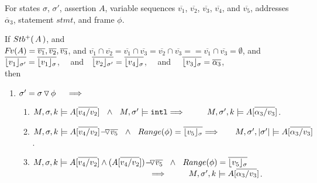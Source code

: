 \begin{lemma}
\label{l:calls}
For states $\sigma$, $\sigma'$, assertion $A$, %
variable sequences  $\overline{v_1}$,    $\overline{v_2}$,  $\overline{v_3}$,   $\overline{v_4}$, and  $\overline{v_5}$,
addresses $\overline \alpha_3$, statement $stmt$, and frame $\phi$.

$ ~ $ %
\\
If $ \Pos A$, and \\
 $\fv(A) =\overline{v_1},\overline{v_2}, \overline{v_3}$,  and  $\overline{v_1} \cap \overline{v_2} = \overline{v_1} \cap \overline{v_3} = \overline{v_2} \cap \overline{v_3} = = \overline{v_1} \cap \overline{v_3} = \emptyset$, and  \\
 $\overline {\interpret {\sigma'} {v_1} } = \overline {\interpret {\sigma} {v_1} }$, \ \ and\ \  $\overline {\interpret {\sigma'}  {v_2} } = \overline {\interpret {\sigma} {v_4} }$, \ \ and \ \  $\overline {\interpret {\sigma}  {v_3} } = \overline {\alpha_3}$,  \\
 then
  
\begin{enumerate}

\item
\label{l:calls:callee}
$\sigma'=\sigma  \pushSymbol \phi  \ \ \ \   \Longrightarrow$

\begin{enumerate}
\item
\label{l:calls:callee:one}
$\satDAssertFrom M  \sigma k   A[\overline {v_4/v_2}] \ \    \wedge\ \ M, \sigma' \models \intThis  
 \hfill  \Longrightarrow\ \ \ \ \ \ \  \ \satDAssertFrom M  {\sigma'} k   A[\overline { \alpha_3/v_3}]$.

\item
\label{l:calls:callee:two}
$\satDAssertFrom M  \sigma k   {\PushAS  {v_5} { A[\overline {v_4/v_2}] }}  \ \ \wedge\ \ Range(\phi)=\overline {\interpret {\sigma} {v_5}}
\hfill \Longrightarrow  \ \ \ \  \ \, \satDAssertFrom M  {\sigma'} {\DepthSt {\sigma'}}  {A[\overline  {\alpha_3/v_3}]}$.

\item
\label{l:calls:callee:three}
$\satDAssertFrom M  \sigma k   {A[\overline {v_4/v_2}]  \wedge (\PushAS  {v_5} { A[\overline {v_4/v_2}] )}}  \ \ \wedge\ \ Range(\phi)=\overline {\interpret {\sigma} {v_5}}
  $\\  $
\strut \hspace{5cm} \hfill \Longrightarrow \ \ \ \ \ \ \  \   \satDAssertFrom M  {\sigma'} k  {A[\overline { \alpha_3/v_3}]}$.


\end{enumerate}
\end{enumerate}
\end{lemma}
